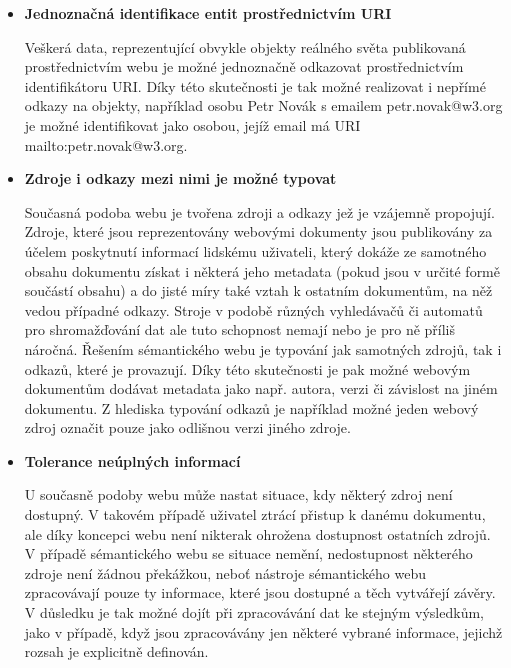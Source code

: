 \documentclass{projekt}
\begin{document}
\begin {itemize}

\item \textbf{Jednoznačná identifikace entit prostřednictvím URI}

\hspace{0.65cm}Veškerá data, reprezentující obvykle objekty reálného světa publikovaná prostřednictvím webu je možné jednoznačně odkazovat prostřednictvím identifikátoru URI. Díky této skutečnosti je tak možné realizovat i nepřímé odkazy na objekty, například osobu Petr Novák s emailem petr.novak@w3.org je možné identifikovat jako osobou, jejíž email má URI mailto:petr.novak@w3.org.


\item \textbf{Zdroje i odkazy mezi nimi je možné typovat}

\hspace{0.65cm}Současná podoba webu je tvořena zdroji a odkazy jež je vzájemně propojují. Zdroje, které jsou reprezentovány webovými dokumenty jsou publikovány za účelem poskytnutí informací lidskému uživateli, který dokáže ze samotného obsahu dokumentu získat i některá jeho metadata (pokud jsou v určité formě součástí obsahu) a do jisté míry také vztah k ostatním dokumentům, na něž vedou případné odkazy. Stroje v podobě různých vyhledávačů či automatů pro shromažďování dat ale tuto schopnost nemají nebo je pro ně příliš náročná. Řešením sémantického webu je typování jak samotných zdrojů, tak i odkazů, které je provazují. Díky této skutečnosti je pak možné webovým dokumentům dodávat metadata jako např. autora, verzi či závislost na jiném dokumentu. Z hlediska typování odkazů je například možné jeden webový zdroj označit pouze jako odlišnou verzi jiného zdroje.


\item \textbf{Tolerance neúplných informací}

\hspace{0.65cm}U současně podoby webu může nastat situace, kdy některý zdroj není dostupný. V takovém případě uživatel ztrácí přistup k danému dokumentu, ale díky koncepci webu není nikterak ohrožena dostupnost ostatních zdrojů. V případě sémantického webu se situace nemění, nedostupnost některého zdroje není žádnou překážkou, neboť nástroje sémantického webu zpracovávají pouze ty informace, které jsou dostupné a těch vytvářejí závěry. V důsledku je tak možné dojít při zpracovávání dat ke stejným výsledkům, jako v případě, když jsou zpracovávány jen některé vybrané informace, jejichž rozsah je explicitně definován.


\end{itemize}
\end{document}

